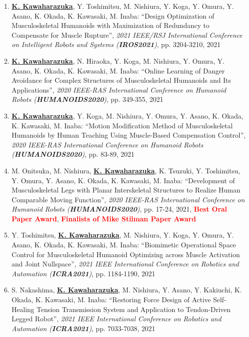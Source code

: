 \documentclass[letterpaper]{article}
\begin{document}
\begin{enumerate}
\item \underline{\textbf{K. Kawaharazuka}}, Y. Toshimitsu, M. Nishiura, Y. Koga, Y. Omura, Y. Asano, K. Okada, K. Kawasaki, M. Inaba: ``Design Optimization of Musculoskeletal Humanoids with Maximization of Redundancy to Compensate for Muscle Rupture'', \textit{2021 IEEE/RSJ International Conference on Intelligent Robots and Systems (\textit{\textbf{IROS2021}})}, pp. 3204-3210, 2021
\item \underline{\textbf{K. Kawaharazuka}}, N. Hiraoka, Y. Koga, M. Nishiura, Y. Omura, Y. Asano, K. Okada, K. Kawasaki, M. Inaba: ``Online Learning of Danger Avoidance for Complex Structures of Musculoskeletal Humanoids and Its Applications'', \textit{2020 IEEE-RAS International Conference on Humanoid Robots (\textit{\textbf{HUMANOIDS2020}})}, pp. 349-355, 2021
\item \underline{\textbf{K. Kawaharazuka}}, Y. Koga, M. Nishiura, Y. Omura, Y. Asano, K. Okada, K. Kawasaki, M. Inaba: ``Motion Modification Method of Musculoskeletal Humanoids by Human Teaching Using Muscle-Based Compensation Control'', \textit{2020 IEEE-RAS International Conference on Humanoid Robots (\textit{\textbf{HUMANOIDS2020}})}, pp. 83-89, 2021
\item M. Onitsuka, M. Nishiura, \underline{\textbf{K. Kawaharazuka}}, K. Tsuzuki, Y. Toshimitsu, Y. Omura, Y. Asano, K. Okada, K. Kawasaki, M. Inaba: ``Development of Musculoskeletal Legs with Planar Interskeletal Structures to Realize Human Comparable Moving Function'', \textit{2020 IEEE-RAS International Conference on Humanoid Robots (\textit{\textbf{HUMANOIDS2020}})}, pp. 17-24, 2021, \textbf{\textcolor{red}{Best Oral Paper Award}}, \textbf{\textcolor{red}{Finalists of Mike Stilman Paper Award}}
\item Y. Toshimitsu, \underline{\textbf{K. Kawaharazuka}}, M. Nishiura, Y. Koga, Y. Omura, Y. Asano, K. Okada, K. Kawasaki, M. Inaba: ``Biomimetic Operational Space Control for Musculoskeletal Humanoid Optimizing across Muscle Activation and Joint Nullspace'', \textit{2021 IEEE International Conference on Robotics and Automation (\textit{\textbf{ICRA2021}})}, pp. 1184-1190, 2021
\item S. Nakashima, \underline{\textbf{K. Kawaharazuka}}, M. Nishiura, Y. Asano, Y. Kakiuchi, K. Okada, K. Kawasaki, M. Inaba: ``Restoring Force Design of Active Self-Healing Tension Transmission System and Application to Tendon-Driven Legged Robot'', \textit{2021 IEEE International Conference on Robotics and Automation (\textit{\textbf{ICRA2021}})}, pp. 7033-7038, 2021

\end{enumerate}
\end{document}
